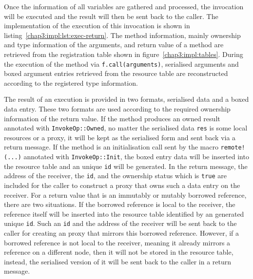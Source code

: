 Once the information of all variables are gathered and processed, the invocation will be executed and the result will then be sent back to the caller. The implementation of the execution of this invocation is shown in listing~\ref{chap3:impl:lst:exec-return}. The method information, mainly ownership and type information of the arguments, and return value of a method are retrieved from the registration table shown in figure~\ref{chap3:impl:tables}. During the execution of the method via \texttt{f.call(arguments)}, serialised arguments and boxed argument entries retrieved from the resource table are reconstructed according to the registered type information.

The result of an execution is provided in two formats, serialised data and a boxed data entry. These two formats are used according to the required ownership information of the return value. If the method produces an owned result annotated with \texttt{InvokeOp::Owned}, no matter the serialised data \texttt{res} is some local resources or a proxy, it will be kept as the serialised form and sent back via a return message. If the method is an initialisation call sent by the macro \texttt{remote!(...)} annotated with \texttt{InvokeOp::Init}, the boxed entry data will be inserted into the resource table and an unique \texttt{id} will be generated. In the return message, the address of the receiver, the \texttt{id}, and the ownership status which is \texttt{true} are included for the caller to construct a proxy that owns such a data entry on the receiver. For a return value that is an immutably or mutably borrowed reference, there are two situations. If the borrowed reference is local to the receiver, the reference itself will be inserted into the resource table identified by an generated unique \texttt{id}. Such an \texttt{id} and the address of the receiver will be sent back to the caller for creating an proxy that mirrors this borrowed reference. However, if a borrowed reference is not local to the receiver, meaning it already mirrors a reference on a different node, then it will not be stored in the resource table, instead, the serialised version of it will be sent back to the caller in a return message.
